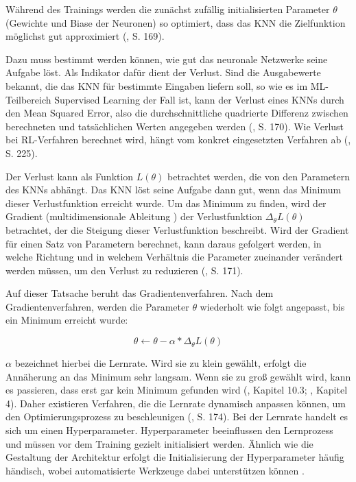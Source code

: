 Während des Trainings werden die zunächst zufällig initialisierten Parameter $\theta$ (Gewichte und Biase der Neuronen) so optimiert, dass das KNN die Zielfunktion möglichst gut approximiert (\cite{Albrecht.2024}, S. 169).

Dazu muss bestimmt werden können, wie gut das neuronale Netzwerke seine Aufgabe löst. Als Indikator dafür dient der Verlust. Sind die Ausgabewerte bekannt, die das KNN für bestimmte Eingaben liefern soll, so wie es im ML-Teilbereich Supervised Learning der Fall ist, kann der Verlust eines KNNs durch den Mean Squared Error, also die durchschnittliche quadrierte Differenz zwischen berechneten und tatsächlichen Werten angegeben werden (\cite{Albrecht.2024}, S. 170). Wie Verlust bei RL-Verfahren berechnet wird, hängt vom konkret eingesetzten Verfahren ab (\cite{Sutton.2018}, S. 225).

Der Verlust kann als Funktion $L(\theta)$ betrachtet werden, die von den Parametern des KNNs abhängt. Das KNN löst seine Aufgabe dann gut, wenn das Minimum dieser Verlustfunktion erreicht wurde. Um das Minimum zu finden, wird der Gradient (\glqq multidimensionale Ableitung \grqq{}) der Verlustfunktion $\Delta_\theta L(\theta)$ betrachtet, der die Steigung dieser Verlustfunktion beschreibt. Wird der Gradient für einen Satz von Parametern berechnet, kann daraus gefolgert werden, in welche Richtung und in welchem Verhältnis die Parameter zueinander verändert werden müssen, um den Verlust zu reduzieren (\cite{Albrecht.2024}, S. 171).

Auf dieser Tatsache beruht das Gradientenverfahren. Nach dem Gradientenverfahren, werden die Parameter $\theta$ wiederholt wie folgt angepasst, bis ein Minimum erreicht wurde:

\[ \theta \leftarrow \theta {-} \alpha * \Delta_\theta L(\theta) \]

$\alpha$ bezeichnet hierbei die Lernrate. Wird sie zu klein gewählt, erfolgt die Annäherung an das Minimum sehr langsam. Wenn sie zu groß gewählt wird, kann es passieren, dass erst gar kein Minimum gefunden wird (\cite{Ferguson.January2019}, Kapitel 10.3; \cite{Buduma.2022}, Kapitel 4). Daher existieren Verfahren, die die Lernrate dynamisch anpassen können, um den Optimierungsprozess zu beschleunigen (\cite{Albrecht.2024}, S. 174). Bei der Lernrate handelt es sich um einen Hyperparameter. Hyperparameter beeinflussen den Lernprozess und müssen vor dem Training gezielt initialisiert werden. Ähnlich wie die Gestaltung der Architektur erfolgt die Initialisierung der Hyperparameter häufig händisch, wobei automatisierte Werkzeuge dabei unterstützen können \cite{Feurer.2019} \cite{Shawki.2021}.

